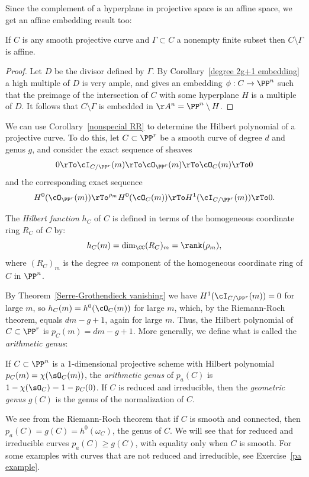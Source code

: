 Since the complement of a hyperplane in projective space is an affine space, we get an affine embedding result too:

\begin{corollary}
 If $C$ is any smooth projective curve and $\Gamma \subset C$ a nonempty finite subset then $C \setminus \Gamma$ is affine.
\end{corollary}
\begin{proof}
Let $D$ be the divisor defined by $\Gamma$. By Corollary~\ref{degree 2g+1 embedding} a high multiple of $D$ is very ample,
and gives an embedding $\phi: C\to \PP^n$ such that the preimage of the intersection of $C$ with some hyperplane $H$
is a multiple of $D$. It follows that $C\setminus \Gamma$ is embedded in $\AA^n = \PP^n\setminus H$.
\end{proof}
 
We can  use Corollary~\ref{nonspecial RR} to determine the Hilbert polynomial of a projective curve. To do this, let $C \subset \PP^r$ be a smooth curve of degree $d$ and genus $g$, and consider the exact sequence of sheaves
$$
0 \rTo \cI_{C/\PP^r}(m) \rTo \cO_{\PP^r}(m) \rTo \cO_C(m) \rTo 0
$$
and the corresponding exact sequence
$$
 H^0(\cO_{\PP^r}(m)) \rTo^{\rho_m} H^0(\cO_C(m)) \rTo H^1(\cI_{C/\PP^r}(m)) \rTo 0.
$$

The \emph{Hilbert function} $h_C$ of $C$  is defined in terms of the homogeneous coordinate ring $R_{C}$ of $C$ by:
$$
h_C(m) = \dim_{\CC} (R_{C})_{m} = \rank(\rho_m),
$$
where $(R_{C})_{m}$ is the degree $m$ component of the homogeneous coordinate ring of $C$ in $\PP^n$.

By Theorem~\ref{Serre-Grothendieck vanishing} we have $H^1(\cI_{C/\PP^r}(m)) = 0$ for large $m$, so $h_{C}(m) = h^0(\cO_C(m))$ for large $m$, which, by the Riemann-Roch theorem, equals $dm-g+1$, again for large $m$. Thus, the Hilbert polynomial of $C \subset \PP^r$ is $p_C(m) = dm-g+1$. 
More generally, we define what is called the \emph{arithmetic genus}:

\begin{definition}\label{genus Hilbert}\label{pa}\label{genus formula}
If $C\subset \PP^n$ is a 1-dimensional projective scheme with Hilbert polynomial
$p_C(m) = \chi(\sO_C(m))$, the \emph{arithmetic genus} of $p_a(C)$ is $1-\chi(\sO_{C}) = 1-p_C(0)$. If $C$ is reduced and irreducible, then
the \emph{geometric genus} $g(C)$ is the genus of the normalization of $C$.
\end{definition}
We see from the Riemann-Roch theorem that if $C$ is smooth and connected, then $p_a(C) = g(C) = h^0(\omega_C)$, the genus of $C$. We
will see that for reduced and irreducible curves $p_a(C) \geq g(C)$, with equality only when $C$ is smooth.
  For some examples with curves that are not
reduced and irreducible, see Exercise~\ref{pa example}.
  

